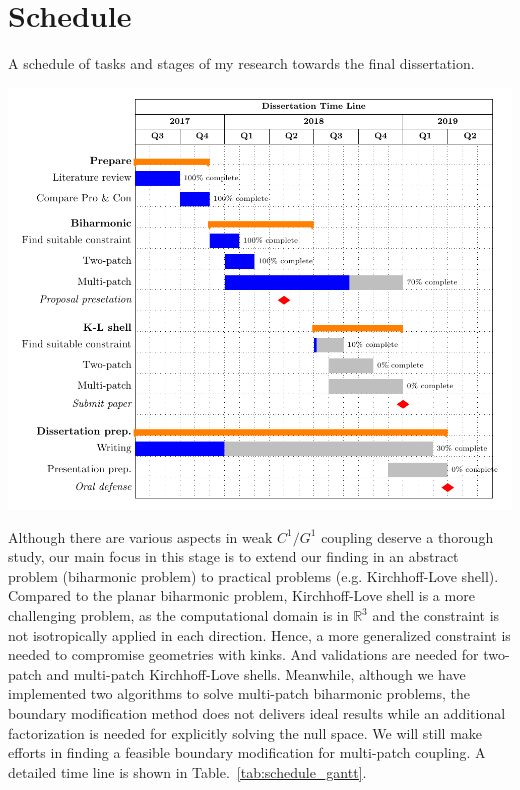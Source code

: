 \documentclass[preprint,12pt]{elsarticle}
\begin{document}
\section{Schedule}
\begin{table}[hbt]
    \caption{A schedule of tasks and stages of my research towards the final dissertation.}
    \hspace*{-1.5in}
	\centering
    \includegraphics[width=1.5\linewidth]{schedule}\label{tab:schedule_gantt}
\end{table}
Although there are various aspects in weak $C^1/G^1$ coupling deserve a thorough study, our main focus in this stage is to extend our finding in an abstract problem (biharmonic problem) to practical problems (e.g. Kirchhoff-Love shell). Compared to the planar biharmonic problem, Kirchhoff-Love shell is a more challenging problem, as the computational domain is in $\mathbb{R}^3$ and the constraint is not isotropically applied in each direction. Hence, a more generalized constraint is needed to compromise geometries with kinks. And validations are needed for two-patch and multi-patch Kirchhoff-Love shells. Meanwhile, although we have implemented two algorithms to solve multi-patch biharmonic problems, the boundary modification method does not delivers ideal results while an additional factorization is needed for explicitly solving the null space. We will still make efforts in finding a feasible boundary modification for multi-patch coupling. A detailed time line is shown in Table.~\ref{tab:schedule_gantt}.

\clearpage


\end{document}
